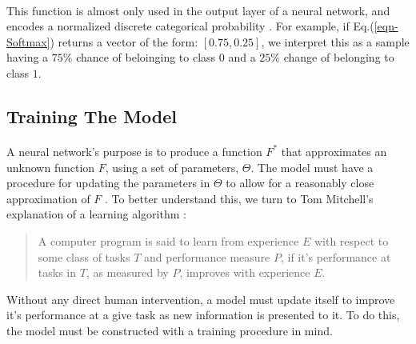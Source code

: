 \documentclass[12pt,letterpaper]{article}
\begin{document}
\paragraph*{}This function is almost only used in the output layer of a neural network, and encodes a normalized discrete categorical probability \cite{Loy,Virtanen}. For example, if Eq.(\ref{eqn-Softmax}) returns a vector of the form: $[ 0.75 , 0.25]$, we interpret this as a sample having a $75\%$ chance of beloinging to class $0$ and a $25\%$ change of belonging to class $1$.



\subsection{Training The Model}
\label{subsec-Training}

\paragraph*{}A neural network's purpose is to produce a function $F^*$ that approximates an unknown function $F$, using a set of parameters, $\Theta$. The model must have a procedure for updating the parameters in $\Theta$ to allow for a reasonably close approximation of $F$ \cite{Goodfellow}. To better understand this, we turn to Tom Mitchell's explanation of a learning algorithm \cite{Mitchell}:
\begin{quote}
A computer program is said to learn from experience $E$ with respect to some class of tasks $T$ and performance measure $P$, if it's performance at tasks in $T$, as measured by $P$, improves with experience $E$.
\end{quote}
Without any direct human intervention, a model must update itself to improve it's performance at a give task as new information is presented to it. To do this, the model must be constructed with a training procedure in mind. 
\end{document}
